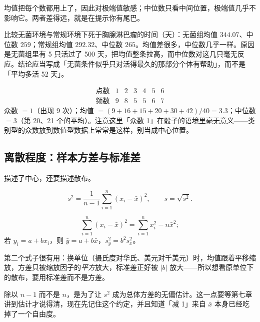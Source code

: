 \begin{proposition}[均值与中位数的分工]
均值把每个数都用上了，因此对极端值敏感；中位数只看中间位置，极端值几乎不影响它。两者差得远，就是在提示你有尾巴。
\end{proposition}

\begin{example}
比较无菌环境与常规环境下死于胸腺淋巴瘤的时间（天）：无菌组均值 $344.07$、中位数 $259$；常规组均值 $292.32$、中位数 $265$。均值差很多，中位数几乎一样。原因是无菌组里有 5 只活过了 500 天，把均值整条拉高，而中位数对这几只毫无反应。结论应当写成「无菌条件似乎只对活得最久的那部分个体有帮助」，而不是「平均多活 52 天」。
\end{example}

\begin{example}[掷骰子 40 次]
\[
\begin{array}{c|cccccc}
\text{点数} & 1 & 2 & 3 & 4 & 5 & 6\\ \hline
\text{频数} & 9 & 8 & 5 & 5 & 6 & 7
\end{array}
\]
众数 $=1$（出现 9 次）；均值 $=(9+16+15+20+30+42)/40=3.3$；中位数 $=3$（第 20、21 个的平均）。注意这里「众数 1」在骰子的语境里毫无意义——类别型的众数放到数值型数据上常常是这样，别当成中心位置。
\end{example}

\subsection{离散程度：样本方差与标准差}

描述了中心，还要描述散布。

\begin{definition}[样本方差与标准差]
\[
s^2=\frac{1}{n-1}\sum_{i=1}^{n}(x_i-\bar x)^2,\qquad s=\sqrt{s^2}.
\]
\end{definition}

\begin{proposition}[两个常用恒等式]
\[
\sum_{i=1}^{n}(x_i-\bar x)^2=\sum_{i=1}^{n}x_i^{2}-n\bar x^{2};
\]
若 $y_i=a+bx_i$，则 $\bar y=a+b\bar x$，$s_y^{2}=b^{2}s_x^{2}$。
\end{proposition}

第二个式子很有用：换单位（摄氏度对华氏、美元对千美元）时，均值跟着平移缩放，方差只被缩放因子的\emph{平方}放大，标准差正好被 $|b|$ 放大——所以想看原单位下的散布，要用标准差而不是方差。

\begin{remark}[为什么除以 $n-1$]
除以 $n-1$ 而不是 $n$，是为了让 $s^2$ 成为总体方差的无偏估计。这一点要等第七章讲到估计才说得清，现在先记住这个约定，并且知道「减 1」来自 $\bar x$ 本身已经吃掉了一个自由度。
\end{remark}

